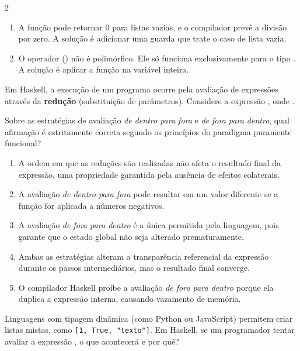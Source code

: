 \documentclass[a4paper,10pt,brazil]{article}
\begin{document}
\begin{multicols}{2}
\begin{enumerate}
  \item A função  pode retornar 0 para listas vazias, e o compilador prevê a divisão por zero. A solução é adicionar uma guarda que trate o caso de lista vazia.

  \item O operador (\haskellinline{/}) não é polimórfico. Ele só funciona exclusivamente para o tipo . A solução é aplicar a função  na variável  inteira.


\end{enumerate}

Em Haskell, a execução de um programa ocorre pela avaliação de expressões através da \textbf{redução} (substituição de parâmetros). Considere a expressão , onde . 

Sobre as estratégias de avaliação \emph{de dentro para fora} e \emph{de fora para dentro}, qual afirmação é estritamente correta segundo os princípios do paradigma puramente funcional?

\begin{enumerate}
  \item A ordem em que as reduções são realizadas não afeta o resultado final da expressão, uma propriedade garantida pela ausência de efeitos colaterais.

  \item A avaliação \emph{de dentro para fora} pode resultar em um valor diferente se a função  for aplicada a números negativos.

  \item A avaliação \emph{de fora para dentro} é a única permitida pela linguagem, pois garante que o estado global não seja alterado prematuramente.

  \item Ambas as estratégias alteram a transparência referencial da expressão durante os passos intermediários, mas o resultado final converge.

  \item O compilador Haskell proíbe a avaliação \emph{de fora para dentro} porque ela duplica a expressão interna, causando vazamento de memória.


\end{enumerate}

Linguagens com tipagem dinâmica (como Python ou JavaScript) permitem criar listas mistas, como \texttt{[1, True, "texto"]}. Em Haskell, se um programador tentar avaliar a expressão , o que acontecerá e por quê?


\end{multicols}
\end{document}
